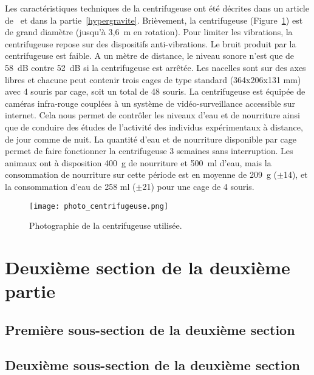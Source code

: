 		Les caractéristiques techniques de la centrifugeuse ont été décrites dans un article de~\cite{jamon_ground-based_2008} et dans la partie~\ref{hypergravite}. Brièvement, la centrifugeuse (Figure~\ref{photo_centrifugeuse}) est de grand diamètre (jusqu'à 3,6~m en rotation). Pour limiter les vibrations, la centrifugeuse repose sur des dispositifs anti-vibrations. Le bruit produit par la centrifugeuse est faible. A un mètre de distance, le niveau sonore n'est que de 58~dB contre 52~dB si la centrifugeuse est arrêtée. Les nacelles sont sur des axes libres et chacune peut contenir trois cages de type standard (364x206x131 mm) avec 4 souris par cage, soit un total de 48 souris. La centrifugeuse est équipée de caméras infra-rouge couplées à un système de vidéo-surveillance accessible sur internet. Cela nous permet de contrôler les niveaux d'eau et de nourriture ainsi que de conduire des études de l'activité des individus expérimentaux à distance, de jour comme de nuit. La quantité d'eau et de nourriture disponible par cage permet de faire fonctionner la centrifugeuse 3 semaines sans interruption. Les animaux ont à disposition 400~g de nourriture et 500~ml d'eau, mais la consommation de nourriture sur cette période est en moyenne de 209~g ($\pm$14), et la consommation d'eau de 258 ml ($\pm$21) pour une cage de 4 souris.
		
		\begin{figure}[h!tbp]
			\vspace{0.5cm}
			\setcapindent{2em}
			\centering
			\texttt{[image: photo\_centrifugeuse.png]}
			\caption[Photographie de la centrifugeuse]{Photographie de la centrifugeuse utilisée.}
			\label{photo_centrifugeuse}
		\end{figure}

		\lipsum[2]

\section{Deuxième section de la deuxième partie}

	\lipsum[3]

		\subsection{Première sous-section de la deuxième section}

		\lipsum[4]

		\subsection[Sous-sous section 2]{Deuxième sous-section de la deuxième section} %


